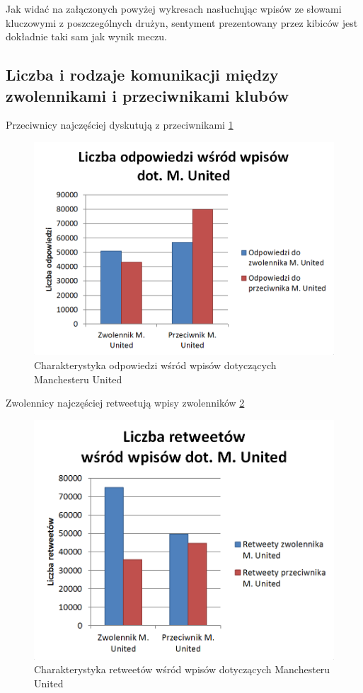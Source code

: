 Jak widać na załączonych powyżej wykresach nasłuchując wpisów ze słowami kluczowymi
z poszczególnych drużyn, sentyment prezentowany przez kibiców jest dokładnie taki
sam jak wynik meczu. 


\clearpage
\subsection{Liczba i rodzaje komunikacji między zwolennikami i przeciwnikami klubów}

Przeciwnicy najczęściej dyskutują z przeciwnikami \ref{image:replies-munited}

\begin{figure}[ht!]
\centering
\includegraphics[width=120mm]{img/replies-munited.png}
\caption{Charakterystyka odpowiedzi wśród wpisów dotyczących Manchesteru United}
\label{image:replies-munited}
\end{figure}

Zwolennicy najczęściej retweetują wpisy zwolenników \ref{image:retweety-munited}

\begin{figure}[ht!]
\centering
\includegraphics[width=120mm]{img/retweety-munited.png}
\caption{Charakterystyka retweetów wśród wpisów dotyczących Manchesteru United}
\label{image:retweety-munited}
\end{figure}


